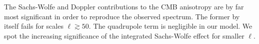 


The Sachs-Wolfe and Doppler contributions to the CMB anisotropy are by far most significant in order to reproduce the observed spectrum. The former by itself fails for scales $\ell\gtrsim 50$. The quadrupole term is negligible in our model. We spot the increasing significance of the integrated Sachs-Wolfe effect for smaller $\ell$.